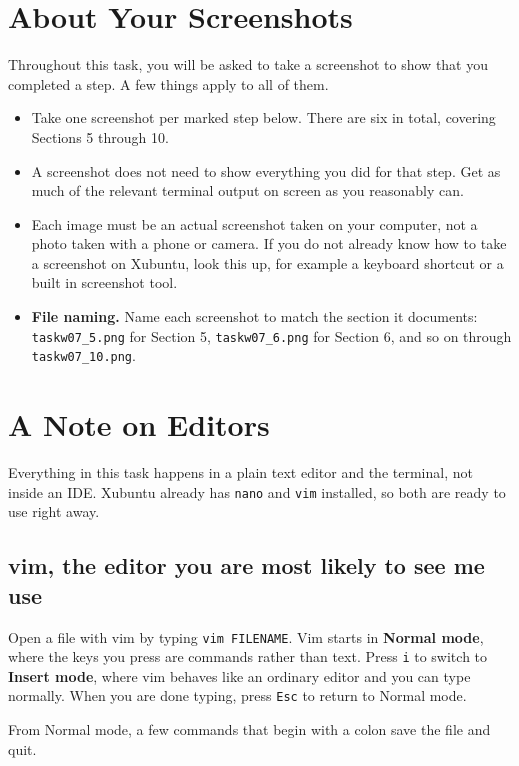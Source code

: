 \documentclass[11pt]{article}
\begin{document}
\section{About Your Screenshots}

Throughout this task, you will be asked to take a screenshot to show that
you completed a step. A few things apply to all of them.

\begin{itemize}
  \item Take one screenshot per marked step below. There are six in total,
    covering Sections 5 through 10.
  \item A screenshot does not need to show everything you did for that step.
    Get as much of the relevant terminal output on screen as you reasonably
    can.
  \item Each image must be an actual screenshot taken on your computer, not
    a photo taken with a phone or camera. If you do not already know how to
    take a screenshot on Xubuntu, look this up, for example a keyboard
    shortcut or a built in screenshot tool.
  \item \textbf{File naming.} Name each screenshot to match the section it
    documents: \texttt{taskw07\_5.png} for Section 5, \texttt{taskw07\_6.png}
    for Section 6, and so on through \texttt{taskw07\_10.png}.
\end{itemize}

\section{A Note on Editors}

Everything in this task happens in a plain text editor and the terminal,
not inside an IDE. Xubuntu already has \texttt{nano} and
\texttt{vim} installed, so both are ready to use right away.

\subsection{vim, the editor you are most likely to see me use}

Open a file with vim by typing \texttt{vim FILENAME}. Vim starts in
\textbf{Normal mode}, where the keys you press are commands rather than
text. Press \texttt{i} to switch to \textbf{Insert mode}, where vim behaves
like an ordinary editor and you can type normally. When you are done typing,
press \texttt{Esc} to return to Normal mode.

From Normal mode, a few commands that begin with a colon save the file and
quit.
\end{document}
